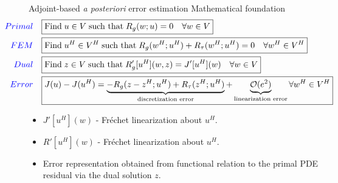 \documentclass[fleqn]{beamer}
\begin{document}

\begin{frame}{Adjoint-based \emph{a posteriori} error estimation}
{Mathematical foundation}
\scriptsize
\begin{equation*}
\hspace*{-3em}
\begin{aligned}
{\color{blue} Primal} \quad &
\boxed{
\text{Find} \; u \in V \; \text{such that} \; R_g(w;u) = 0
\quad \forall w \in V
} \\
{\color{blue} FEM} \quad &
\boxed{
\text{Find} \; u^H \in V^H \; \text{such that} \; R_g(w^H; u^H) 
+ R_{\tau}(w^H; u^H) = 0
\quad \forall w^H \in V^H
} \\
{\color{blue} Dual} \quad &
\boxed{
\text{Find} \; z \in V \; \text{such that} \; R'_g[u^H](w, z) =  J'[u^H](w)
\quad \forall w \in V
} \\
{\color{blue} Error} \quad &
\boxed{
J(u) - J(u^H) =
\underbrace{-R_g(z - z^H; u^H) + R_{\tau}(z^H; u^H)}_{\text{discretization error}} +
\underbrace{\mathcal{O}(e^2)}_{\text{linearization error}}
\forall w^H \in V^H
}
\end{aligned}
\end{equation*}

\begin{itemize}
\item $J'[u^H](w)$ - Fr\'{e}chet linearization about $u^H$.
\item $R'[u^H](w)$ - Fr\'{e}chet linearization about $u^H$.
\item Error representation obtained from functional relation to the
primal PDE residual via the dual solution $z$.
\end{itemize}
\end{frame}

\end{document}
